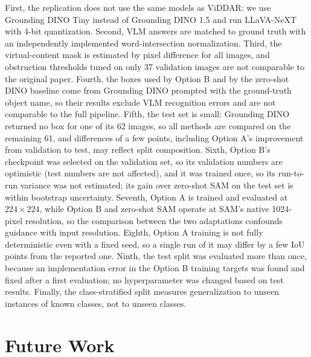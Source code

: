\documentclass[conference]{IEEEtran}
\begin{document}
First, the replication does not use the same models as ViDDAR: we use Grounding DINO Tiny instead of Grounding DINO 1.5 and run LLaVA-NeXT with 4-bit quantization. Second, VLM answers are matched to ground truth with an independently implemented word-intersection normalization. Third, the virtual-content mask is estimated by pixel difference for all images, and obstruction thresholds tuned on only 37 validation images are not comparable to the original paper. Fourth, the boxes used by Option B and by the zero-shot DINO baseline come from Grounding DINO prompted with the ground-truth object name, so their results exclude VLM recognition errors and are not comparable to the full pipeline. Fifth, the test set is small: Grounding DINO returned no box for one of its 62 images, so all methods are compared on the remaining 61, and differences of a few points, including Option A's improvement from validation to test, may reflect split composition. Sixth, Option B's checkpoint was selected on the validation set, so its validation numbers are optimistic (test numbers are not affected), and it was trained once, so its run-to-run variance was not estimated; its gain over zero-shot SAM on the test set is within bootstrap uncertainty. Seventh, Option A is trained and evaluated at $224\times224$, while Option B and zero-shot SAM operate at SAM's native 1024-pixel resolution, so the comparison between the two adaptations confounds guidance with input resolution. Eighth, Option A training is not fully deterministic even with a fixed seed, so a single run of it may differ by a few IoU points from the reported one. Ninth, the test split was evaluated more than once, because an implementation error in the Option B training targets was found and fixed after a first evaluation; no hyperparameter was changed based on test results. Finally, the class-stratified split measures generalization to unseen instances of known classes, not to unseen classes.


\section{Future Work}
\end{document}
